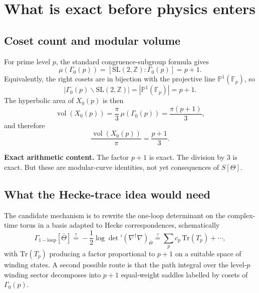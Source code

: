 \documentclass[12pt,a4paper]{article}
\theoremstyle{remark}
\begin{document}
\section{What is exact before physics enters}

\subsection{Coset count and modular volume}

For prime level $p$, the standard congruence-subgroup formula gives
\begin{equation}
  \mu(\Gamma_0(p)) = [\mathrm{SL}(2,\mathbb{Z}):\Gamma_0(p)] = p+1.
  \label{eq:index}
\end{equation}
Equivalently, the right cosets are in bijection with the projective line
$\mathbb{P}^1(\mathbb{F}_p)$, so
\begin{equation}
  |\Gamma_0(p)\backslash \mathrm{SL}(2,\mathbb{Z})|
  = |\mathbb{P}^1(\mathbb{F}_p)|
  = p+1.
  \label{eq:p1}
\end{equation}
The hyperbolic area of $X_0(p)$ is then
\begin{equation}
  \operatorname{vol}(X_0(p))
  = \frac{\pi}{3}\,\mu(\Gamma_0(p))
  = \frac{\pi(p+1)}{3},
  \label{eq:vol}
\end{equation}
and therefore
\begin{equation}
  \frac{\operatorname{vol}(X_0(p))}{\pi} = \frac{p+1}{3}.
  \label{eq:volnorm}
\end{equation}

\begin{resultbox}
\textbf{Exact arithmetic content.}  The factor $p+1$ is exact.  The division by
$3$ is exact.  But these are modular-curve identities, not yet consequences of
$S[\Theta]$.
\end{resultbox}

\subsection{What the Hecke-trace idea would need}

The candidate mechanism is to rewrite the one-loop determinant on the
complex-time torus in a basis adapted to Hecke correspondences, schematically
\begin{equation}
  \Gamma_{\mathrm{1-loop}}[\bar{\Theta}]
  \stackrel{?}{=}
  -\frac{1}{2}\log\det{}'(\nabla^\dagger\nabla)_{\bar{\Theta}}
  \stackrel{?}{=}
  \sum_{p} c_p \,\mathrm{Tr}(T_p) + \cdots,
  \label{eq:hecke-schematic}
\end{equation}
with $\mathrm{Tr}(T_p)$ producing a factor proportional to $p+1$ on a suitable
space of winding states.  A second possible route is that the path integral over
the level-$p$ winding sector decomposes into $p+1$ equal-weight saddles labelled
by cosets of $\Gamma_0(p)$.
\end{document}
